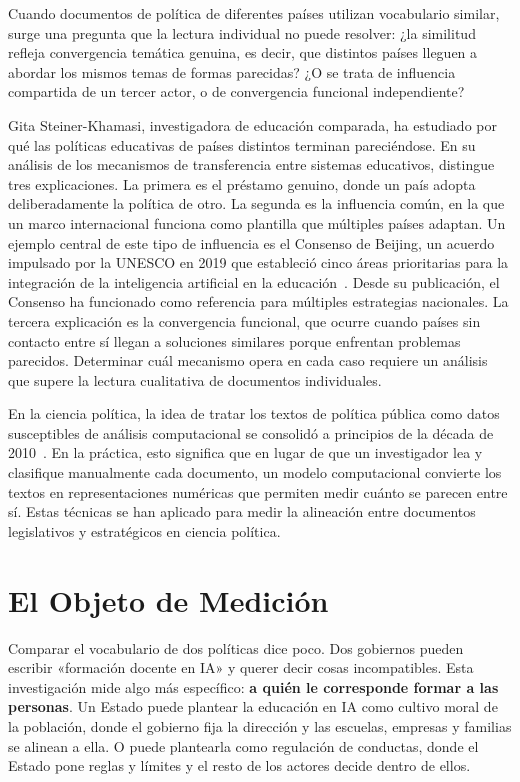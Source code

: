 Cuando documentos de política de diferentes países utilizan vocabulario similar, surge una pregunta que la lectura individual no puede resolver: ¿la similitud refleja convergencia temática genuina, es decir, que distintos países lleguen a abordar los mismos temas de formas parecidas? ¿O se trata de influencia compartida de un tercer actor, o de convergencia funcional independiente?

Gita Steiner-Khamasi, investigadora de educación comparada, ha estudiado por qué las políticas educativas de países distintos terminan pareciéndose. En su análisis de los mecanismos de transferencia entre sistemas educativos, \citet{steinerkhamsi2014cross} distingue tres explicaciones. La primera es el préstamo genuino, donde un país adopta deliberadamente la política de otro. La segunda es la influencia común, en la que un marco internacional funciona como plantilla que múltiples países adaptan. Un ejemplo central de este tipo de influencia es el Consenso de Beijing, un acuerdo impulsado por la UNESCO en 2019 que estableció cinco áreas prioritarias para la integración de la inteligencia artificial en la educación~\citep{unesco2019beijing}. Desde su publicación, el Consenso ha funcionado como referencia para múltiples estrategias nacionales. La tercera explicación es la convergencia funcional, que ocurre cuando países sin contacto entre sí llegan a soluciones similares porque enfrentan problemas parecidos. Determinar cuál mecanismo opera en cada caso requiere un análisis que supere la lectura cualitativa de documentos individuales.

En la ciencia política, la idea de tratar los textos de política pública como datos susceptibles de análisis computacional se consolidó a principios de la década de 2010~\citep{grimmer2013text}. En la práctica, esto significa que en lugar de que un investigador lea y clasifique manualmente cada documento, un modelo computacional convierte los textos en representaciones numéricas que permiten medir cuánto se parecen entre sí. Estas técnicas se han aplicado para medir la alineación entre documentos legislativos y estratégicos en ciencia política.


\section{El Objeto de Medición}

Comparar el vocabulario de dos políticas dice poco. Dos gobiernos pueden escribir «formación docente en IA» y querer decir cosas incompatibles. Esta investigación mide algo más específico: \textbf{a quién le corresponde formar a las personas}. Un Estado puede plantear la educación en IA como cultivo moral de la población, donde el gobierno fija la dirección y las escuelas, empresas y familias se alinean a ella. O puede plantearla como regulación de conductas, donde el Estado pone reglas y límites y el resto de los actores decide dentro de ellos.

